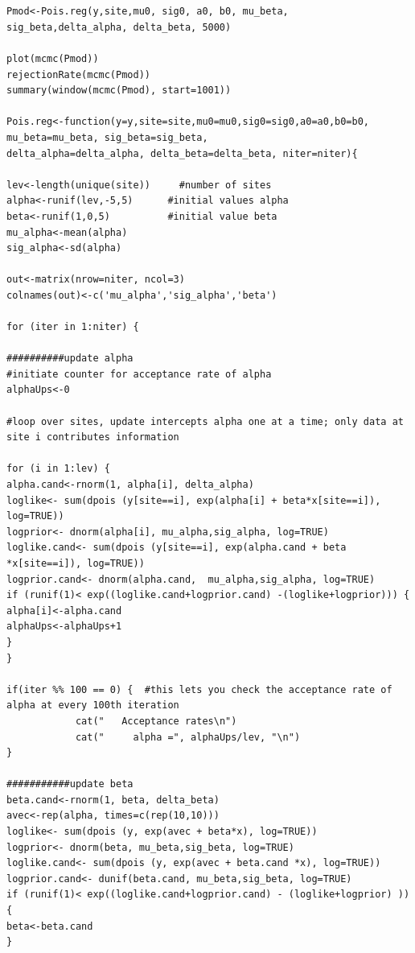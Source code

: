 {\small
\begin{verbatim}


Pmod<-Pois.reg(y,site,mu0, sig0, a0, b0, mu_beta, sig_beta,delta_alpha, delta_beta, 5000)

plot(mcmc(Pmod))
rejectionRate(mcmc(Pmod))
summary(window(mcmc(Pmod), start=1001))

Pois.reg<-function(y=y,site=site,mu0=mu0,sig0=sig0,a0=a0,b0=b0, mu_beta=mu_beta, sig_beta=sig_beta, 
delta_alpha=delta_alpha, delta_beta=delta_beta, niter=niter){

lev<-length(unique(site))     #number of sites
alpha<-runif(lev,-5,5)		#initial values alpha
beta<-runif(1,0,5)			#initial value beta
mu_alpha<-mean(alpha)
sig_alpha<-sd(alpha)

out<-matrix(nrow=niter, ncol=3)	
colnames(out)<-c('mu_alpha','sig_alpha','beta')

for (iter in 1:niter) {

##########update alpha
#initiate counter for acceptance rate of alpha
alphaUps<-0

#loop over sites, update intercepts alpha one at a time; only data at site i contributes information			

for (i in 1:lev) { 		
alpha.cand<-rnorm(1, alpha[i], delta_alpha)	
loglike<- sum(dpois (y[site==i], exp(alpha[i] + beta*x[site==i]), log=TRUE))  
logprior<- dnorm(alpha[i], mu_alpha,sig_alpha, log=TRUE)
loglike.cand<- sum(dpois (y[site==i], exp(alpha.cand + beta *x[site==i]), log=TRUE))
logprior.cand<- dnorm(alpha.cand,  mu_alpha,sig_alpha, log=TRUE)
if (runif(1)< exp((loglike.cand+logprior.cand) -(loglike+logprior))) {
alpha[i]<-alpha.cand
alphaUps<-alphaUps+1
}
}

if(iter %% 100 == 0) {  #this lets you check the acceptance rate of alpha at every 100th iteration
            cat("   Acceptance rates\n")
            cat("     alpha =", alphaUps/lev, "\n")
}

###########update beta
beta.cand<-rnorm(1, beta, delta_beta)
avec<-rep(alpha, times=c(rep(10,10)))
loglike<- sum(dpois (y, exp(avec + beta*x), log=TRUE))  
logprior<- dnorm(beta, mu_beta,sig_beta, log=TRUE)
loglike.cand<- sum(dpois (y, exp(avec + beta.cand *x), log=TRUE))  
logprior.cand<- dunif(beta.cand, mu_beta,sig_beta, log=TRUE)
if (runif(1)< exp((loglike.cand+logprior.cand) - (loglike+logprior) )) {
beta<-beta.cand
}


\end{verbatim}}
